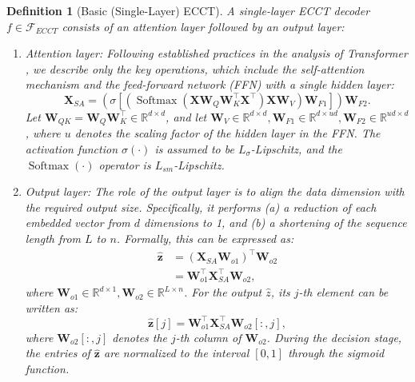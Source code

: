 \documentclass[lettersize,onecolumn]{IEEEtran}
\newtheorem{definition}{Definition}
\begin{document}
\begin{definition}[Basic (Single-Layer) ECCT]\label{def: ECCT single layer}
A single-layer ECCT decoder $f \in \mathcal{F}_{ECCT}$ consists of an attention layer followed by an output layer: 
\begin{enumerate}
    \item Attention layer: Following established practices in the analysis of Transformer \cite{edelman2022inductivebiasTransformerGeneralization}, we describe only the key operations, which include the self-attention mechanism and the feed-forward network (FFN) with a single hidden layer:
    \begin{equation}
        \mathbf{X}_{SA}=\left(\sigma\left[\left(\operatorname{Softmax}\left(\mathbf{X} \mathbf{W}_{Q} \mathbf{W}_{K}^{\top} \mathbf{X}^{\top}\right) \mathbf{X} \mathbf{W}_{V}\right) \mathbf{W}_{F1}\right]\right) \mathbf{W}_{F2}. \label{eq: self-attn, original, single layer}
    \end{equation}
    Let $\mathbf{W}_{QK}= \mathbf{W}_{Q} \mathbf{W}_{K}^{\top} \in \mathbb{R}^{d\times d}$, and let $\mathbf{W}_{V} \in \mathbb{R}^{d\times d}, \mathbf{W}_{F1} \in \mathbb{R}^{d\times ud}, \mathbf{W}_{F2} \in \mathbb{R}^{ud\times d}$, where $u$ denotes the scaling factor of the hidden layer in the FFN. The activation function $\sigma(\cdot)$ is assumed to be $L_{\sigma}$-Lipschitz, and the $\operatorname{Softmax}(\cdot)$ operator is $L_{sm}$-Lipschitz.

    \item Output layer: The role of the output layer is to align the data dimension with the required output size. Specifically, it performs (a) a reduction of each embedded vector from $d$ dimensions to 1, and (b) a shortening of the sequence length from $L$ to $n$. Formally, this can be expressed as: 
    \begin{equation}
        \begin{aligned}
            \hat{\mathbf{z}} &= (\mathbf{X}_{SA}\mathbf{W}_{o1})^{\top}\mathbf{W}_{o2} \\
            &=\mathbf{W}_{o1}^{\top}\mathbf{X}_{SA}^{\top}\mathbf{W}_{o2},
        \end{aligned}
    \end{equation}
    where $\mathbf{W}_{o1}\in \mathbb{R}^{d\times 1}, \mathbf{W}_{o2}\in \mathbb{R}^{L\times n}$. For the output $\hat{z}$, its $j$-th element can be written as: 
    \begin{equation}
        \hat{\mathbf{z}}[j]=\mathbf{W}_{o1}^{\top}\mathbf{X}_{SA}^{\top}\mathbf{W}_{o2}[:,j],
    \end{equation}
    where $\mathbf{W}_{o2}[:,j]$ denotes the $j$-th column of $\mathbf{W}_{o2}$. During the decision stage, the entries of $\hat{\mathbf{z}}$ are normalized to the interval $[0,1]$ through the sigmoid function.
\end{enumerate}
\end{definition}
\end{document}
